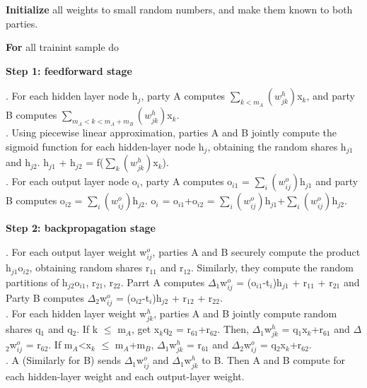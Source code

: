 \documentclass[twoside,twocolumn]{article}
\begin{document}
\begin{algorithm}
	\caption{Privacy-Preserving Distributed Algorithm for Backpropagation Training}
	
	{\bfseries Initialize} all weights to small random numbers, and make them known to both parties.
	
	{\bfseries For} all trainint sample do
	
	{\bfseries Step 1: feedforward stage}
	\begin{flushleft}
	. For each hidden layer node h$_j$, party A computes $\sum_{k<m_A}(w^h_{jk})$x$_k$, and party B computes $\sum_{m_A<k<m_A+m_B}(w^h_{jk})$x$_k$.\\
	. Using piecewise linear approximation, parties A and B jointly compute the sigmoid function for each hidden-layer node h$_j$, obtaining the random shares h$_{j1}$ and h$_{j2}$. h$_{j1}$ + h$_{j2}$ = f($\sum_{k}(w^h_{jk})$x$_k$).\\
	. For each output layer node o$_i$, party A computes o$_{i1}$ = $\sum_{i}(w^o_{ij})$h$_{j1}$ and party B computes o$_{i2}$ = $\sum_{i}(w^o_{ij})$h$_{j2}$. o$_i$ = o$_{i1}$+o$_{i2}$ = $\sum_{i}(w^o_{ij})$h$_{j1}$+$\sum_{i}(w^o_{ij})$h$_{j2}$.
	\end{flushleft}
	
	{\bfseries Step 2: backpropagation stage}
	\begin{flushleft}
		. For each output layer weight w$^o_{ij}$, parties A and B securely compute the product h$_{j1}$o$_{i2}$, obtaining random shares r$_11$ and r$_12$. Similarly, they compute the random partitions of h$_{j2}$o$_{i1}$, r$_21$, r$_22$. Parrt A computes $\Delta$$_1$w$^o_{ij}$ = (o$_{i1}$-t$_i$)h$_{j1}$ + r$_{11}$ + r$_{21}$ and Party B computes $\Delta$$_2$w$^o_{ij}$ = (o$_{i2}$-t$_i$)h$_{j2}$ + r$_{12}$ + r$_{22}$.\\
		. For each hidden layer weight w$^h_{jk}$, parties A and B jointly compute random shares q$_1$ and q$_2$. If k $\le$ m$_A$, get x$_k$q$_2$ = r$_{61}$+r$_{62}$. Then, $\Delta$$_1$w$^h_{jk}$ = q$_1$x$_k$+r$_{61}$ and $\Delta$$_2$w$^o_{ij}$ = r$_{62}$. If m$_A$<x$_k$ $\le$ m$_A$+m$_B$, $\Delta$$_1$w$^h_{jk}$ = r$_61$ and $\Delta$$_2$w$^o_{ij}$ = q$_2$x$_k$+r$_{62}$.\\
		. A (Similarly for B) sends $\Delta$$_1$w$^o_{ij}$ and $\Delta$$_1$w$^h_{jk}$ to B. Then A and B compute for each hidden-layer weight and each output-layer weight.
		
	\end{flushleft}

\end{algorithm}
~\\
\end{document}
